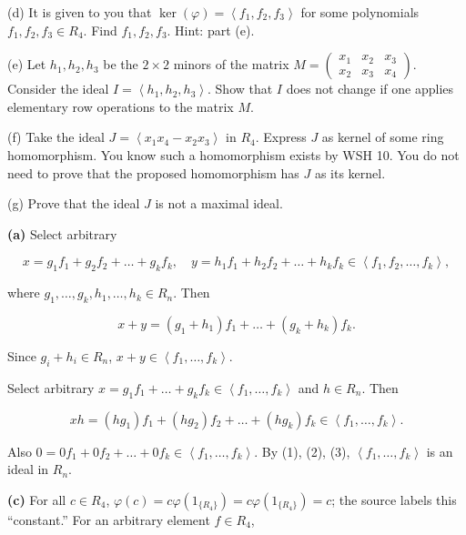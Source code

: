 (d) It is given to you that \(\ker(\varphi) = \left\langle {f_{1},f_{2},f_{3}} \right\rangle\) for some polynomials \(f_{1},f_{2},f_{3} \in R_{4}\). Find \(f_{1},f_{2},f_{3}\). Hint: part (e).

(e) Let \(h_{1},h_{2},h_{3}\) be the \(2 \times 2\) minors of the matrix \(M = \begin{pmatrix}
x_{1} & x_{2} & x_{3} \\
x_{2} & x_{3} & x_{4}
\end{pmatrix}\). Consider the ideal \(I = \left\langle {h_{1},h_{2},h_{3}} \right\rangle\). Show that \(I\) does not change if one applies elementary row operations to the matrix \(M\).

(f) Take the ideal \(J = \left\langle {x_{1}x_{4} - x_{2}x_{3}} \right\rangle\) in \(R_{4}\). Express \(J\) as kernel of some ring homomorphism. You know such a homomorphism exists by WSH 10. You do not need to prove that the proposed homomorphism has \(J\) as its kernel.

(g) Prove that the ideal \(J\) is not a maximal ideal.

\textbf{(a)} Select arbitrary

\[x = g_{1}f_{1} + g_{2}f_{2} + \ldots + g_{k}f_{k},\quad y = h_{1}f_{1} + h_{2}f_{2} + \ldots + h_{k}f_{k} \in \left\langle {f_{1},f_{2},\ldots,f_{k}} \right\rangle,\]

where \(g_{1},\ldots,g_{k},h_{1},\ldots,h_{k} \in R_{n}\). Then

\[x + y = \left( {g_{1} + h_{1}} \right)f_{1} + \ldots + \left( {g_{k} + h_{k}} \right)f_{k}.\]

Since \(g_{i} + h_{i} \in R_{n}\), \(x + y \in \left\langle {f_{1},\ldots,f_{k}} \right\rangle\).

Select arbitrary \(x = g_{1}f_{1} + \ldots + g_{k}f_{k} \in \left\langle {f_{1},\ldots,f_{k}} \right\rangle\) and \(h \in R_{n}\). Then

\[xh = \left( {hg_{1}} \right)f_{1} + \left( {hg_{2}} \right)f_{2} + \ldots + \left( {hg_{k}} \right)f_{k} \in \left\langle {f_{1},\ldots,f_{k}} \right\rangle.\]

Also \(0 = 0f_{1} + 0f_{2} + \ldots + 0f_{k} \in \left\langle {f_{1},\ldots,f_{k}} \right\rangle\). By (1), (2), (3), \(\left\langle {f_{1},\ldots,f_{k}} \right\rangle\) is an ideal in \(R_{n}\).

\textbf{(c)} For all \(c \in R_{4}\), \(\varphi(c) = c\varphi\left( 1_{\{ R_{4}\}} \right) = c\varphi\left( 1_{\{ R_{4}\}} \right) = c\); the source labels this ``constant.'' For an arbitrary element \(f \in R_{4}\),

